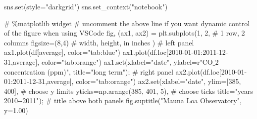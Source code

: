 \documentclass[
  letterpaper,
  DIV=11,
  numbers=noendperiod,
  oneside]{scrreprt}
\newenvironment{Shaded}{\begin{snugshade}}{\end{snugshade}}
\newcommand{\BuiltInTok}[1]{\textcolor[rgb]{0.00,0.23,0.31}{#1}}
\newcommand{\CommentTok}[1]{\textcolor[rgb]{0.37,0.37,0.37}{#1}}
\newcommand{\DecValTok}[1]{\textcolor[rgb]{0.68,0.00,0.00}{#1}}
\newcommand{\FloatTok}[1]{\textcolor[rgb]{0.68,0.00,0.00}{#1}}
\newcommand{\NormalTok}[1]{\textcolor[rgb]{0.00,0.23,0.31}{#1}}
\newcommand{\OperatorTok}[1]{\textcolor[rgb]{0.37,0.37,0.37}{#1}}
\newcommand{\StringTok}[1]{\textcolor[rgb]{0.13,0.47,0.30}{#1}}
\newcommand{\VerbatimStringTok}[1]{\textcolor[rgb]{0.13,0.47,0.30}{#1}}
\begin{document}
\begin{Shaded}
\begin{Highlighting}[]
\NormalTok{sns.}\BuiltInTok{set}\NormalTok{(style}\OperatorTok{=}\StringTok{"darkgrid"}\NormalTok{)}
\NormalTok{sns.set\_context(}\StringTok{"notebook"}\NormalTok{)}

\CommentTok{\# \%matplotlib widget}
\CommentTok{\# uncomment the above line if you want dynamic control of the figure when using VSCode}
\NormalTok{fig, (ax1, ax2) }\OperatorTok{=}\NormalTok{ plt.subplots(}\DecValTok{1}\NormalTok{, }\DecValTok{2}\NormalTok{,  }\CommentTok{\# 1 row, 2 columns}
\NormalTok{                               figsize}\OperatorTok{=}\NormalTok{(}\DecValTok{8}\NormalTok{,}\DecValTok{4}\NormalTok{)  }\CommentTok{\# width, height, in inches}
\NormalTok{                               )}
\CommentTok{\# left panel}
\NormalTok{ax1.plot(df[}\StringTok{\textquotesingle{}average\textquotesingle{}}\NormalTok{], color}\OperatorTok{=}\StringTok{"tab:blue"}\NormalTok{)}
\NormalTok{ax1.plot(df.loc[}\StringTok{\textquotesingle{}2010{-}01{-}01\textquotesingle{}}\NormalTok{:}\StringTok{\textquotesingle{}2011{-}12{-}31\textquotesingle{}}\NormalTok{,}\StringTok{\textquotesingle{}average\textquotesingle{}}\NormalTok{], color}\OperatorTok{=}\StringTok{"tab:orange"}\NormalTok{)}
\NormalTok{ax1.}\BuiltInTok{set}\NormalTok{(xlabel}\OperatorTok{=}\StringTok{"date"}\NormalTok{,}
\NormalTok{       ylabel}\OperatorTok{=}\VerbatimStringTok{r"CO$\_2$ concentration (ppm)"}\NormalTok{,}
\NormalTok{       title}\OperatorTok{=}\StringTok{"long term"}\NormalTok{)}\OperatorTok{;}
\CommentTok{\# right panel}
\NormalTok{ax2.plot(df.loc[}\StringTok{\textquotesingle{}2010{-}01{-}01\textquotesingle{}}\NormalTok{:}\StringTok{\textquotesingle{}2011{-}12{-}31\textquotesingle{}}\NormalTok{,}\StringTok{\textquotesingle{}average\textquotesingle{}}\NormalTok{], color}\OperatorTok{=}\StringTok{"tab:orange"}\NormalTok{)}
\NormalTok{ax2.}\BuiltInTok{set}\NormalTok{(xlabel}\OperatorTok{=}\StringTok{"date"}\NormalTok{,}
\NormalTok{        ylim}\OperatorTok{=}\NormalTok{[}\DecValTok{385}\NormalTok{, }\DecValTok{400}\NormalTok{],  }\CommentTok{\# choose y limits}
\NormalTok{        yticks}\OperatorTok{=}\NormalTok{np.arange(}\DecValTok{385}\NormalTok{, }\DecValTok{401}\NormalTok{, }\DecValTok{5}\NormalTok{),  }\CommentTok{\# choose ticks}
\NormalTok{        title}\OperatorTok{=}\StringTok{"years 2010{-}{-}2011"}\NormalTok{)}\OperatorTok{;}
\CommentTok{\# title above both panels}
\NormalTok{fig.suptitle(}\StringTok{"Mauna Loa Observatory"}\NormalTok{, y}\OperatorTok{=}\FloatTok{1.00}\NormalTok{)}


\end{Highlighting}
\end{Shaded}
\end{document}
